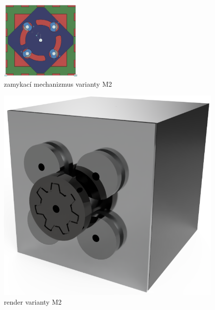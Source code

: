 \begin{figure}[htbp]
    \includegraphics[width=150]{kapitoly/obrazky/M2/mechanizmus_zamceno.png}
    \caption{zamykací mechanizmus varianty M2}
    \label{fig:M2-mechanizmus}
\end{figure}

\begin{figure}[htbp]
    \centering
    \includegraphics[width=\textwidth]{kapitoly/obrazky/M2/predni_render.PNG}
    \caption{render varianty M2}
    \label{fig:M1.0}
\end{figure}


\newpage
